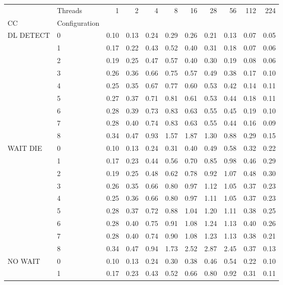 \begin{tabular}{llrrrrrrrrr}
\toprule
       & Threads &  1   &  2   &  4   &  8   &  16  &  28  &  56  &  112 &  224 \\
CC & Configuration &      &      &      &      &      &      &      &      &      \\
\midrule
DL DETECT & 0 & 0.10 & 0.13 & 0.24 & 0.29 & 0.26 & 0.21 & 0.13 & 0.07 & 0.05 \\
       & 1 & 0.17 & 0.22 & 0.43 & 0.52 & 0.40 & 0.31 & 0.18 & 0.07 & 0.06 \\
       & 2 & 0.19 & 0.25 & 0.47 & 0.57 & 0.40 & 0.30 & 0.19 & 0.08 & 0.06 \\
       & 3 & 0.26 & 0.36 & 0.66 & 0.75 & 0.57 & 0.49 & 0.38 & 0.17 & 0.10 \\
       & 4 & 0.25 & 0.35 & 0.67 & 0.77 & 0.60 & 0.53 & 0.42 & 0.14 & 0.11 \\
       & 5 & 0.27 & 0.37 & 0.71 & 0.81 & 0.61 & 0.53 & 0.44 & 0.18 & 0.11 \\
       & 6 & 0.28 & 0.39 & 0.73 & 0.83 & 0.63 & 0.55 & 0.45 & 0.19 & 0.10 \\
       & 7 & 0.28 & 0.40 & 0.74 & 0.83 & 0.63 & 0.55 & 0.44 & 0.16 & 0.09 \\
       & 8 & 0.34 & 0.47 & 0.93 & 1.57 & 1.87 & 1.30 & 0.88 & 0.29 & 0.15 \\
WAIT DIE & 0 & 0.10 & 0.13 & 0.24 & 0.31 & 0.40 & 0.49 & 0.58 & 0.32 & 0.22 \\
       & 1 & 0.17 & 0.23 & 0.44 & 0.56 & 0.70 & 0.85 & 0.98 & 0.46 & 0.29 \\
       & 2 & 0.19 & 0.25 & 0.48 & 0.62 & 0.78 & 0.92 & 1.07 & 0.48 & 0.30 \\
       & 3 & 0.26 & 0.35 & 0.66 & 0.80 & 0.97 & 1.12 & 1.05 & 0.37 & 0.23 \\
       & 4 & 0.25 & 0.36 & 0.66 & 0.80 & 0.97 & 1.11 & 1.05 & 0.37 & 0.23 \\
       & 5 & 0.28 & 0.37 & 0.72 & 0.88 & 1.04 & 1.20 & 1.11 & 0.38 & 0.25 \\
       & 6 & 0.28 & 0.40 & 0.75 & 0.91 & 1.08 & 1.24 & 1.13 & 0.40 & 0.26 \\
       & 7 & 0.28 & 0.40 & 0.74 & 0.90 & 1.08 & 1.23 & 1.13 & 0.38 & 0.21 \\
       & 8 & 0.34 & 0.47 & 0.94 & 1.73 & 2.52 & 2.87 & 2.45 & 0.37 & 0.13 \\
NO WAIT & 0 & 0.10 & 0.13 & 0.24 & 0.30 & 0.38 & 0.46 & 0.54 & 0.22 & 0.10 \\
       & 1 & 0.17 & 0.23 & 0.43 & 0.52 & 0.66 & 0.80 & 0.92 & 0.31 & 0.11 \\

\end{tabular}
